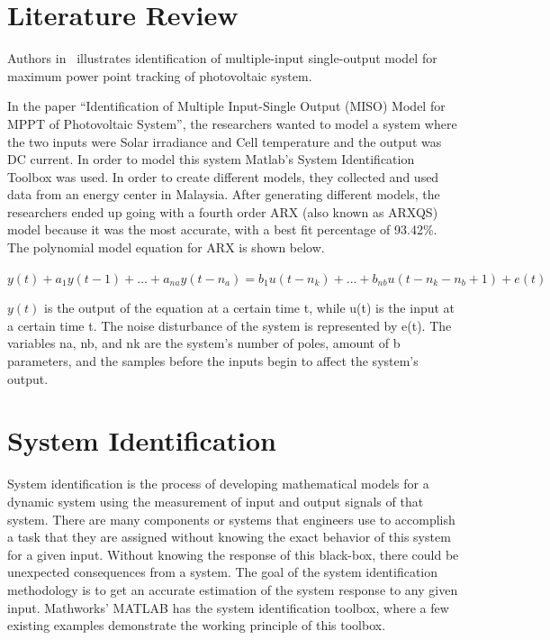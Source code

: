 \documentclass[letterpaper,12pt]{article}   %
\begin{document}
 \section{Literature Review}

Authors in~\cite{Hussain2011} illustrates identification of multiple-input single-output model for maximum power point tracking of photovoltaic system.  
 
In the paper “Identification of Multiple Input-Single Output (MISO) Model for MPPT of Photovoltaic System”, the researchers wanted to model a system where the two inputs were Solar irradiance and Cell temperature and the output was DC current. In order to model this system Matlab’s System Identification Toolbox was used. In order to create different models, they collected and used data from an energy center in Malaysia. After generating different models, the researchers ended up going with a fourth order ARX (also known as ARXQS) model because it was the most accurate, with a best fit percentage of 93.42\%. The polynomial model equation for ARX is shown below. 

$y(t) + a_1y(t - 1) +...+a_{na}y(t - n_{a}) = b_{1}u(t-n_{k})+...+b_{nb}u(t - n_{k}-n_{b}+1) + e(t)$

$y(t)$ is the output of the equation at a certain time t, while u(t) is the input at a certain time t. The noise disturbance of the system is represented by e(t). The variables na, nb, and nk are the system’s number of poles, amount of b parameters, and the samples before the inputs begin to affect the system’s output.



\section{System Identification}

System identification is the process of developing mathematical models for a dynamic system using the measurement of input and output signals of that system. There are many components or systems that engineers use to accomplish a task that they are assigned without knowing the exact behavior of this system for a given input. Without knowing the response of this black-box, there could be unexpected consequences from a system. The goal of the system identification methodology is to get an accurate estimation of the system response to any given input. Mathworks' MATLAB has the system identification toolbox, where a few existing examples demonstrate the working principle of this toolbox.
\end{document}
